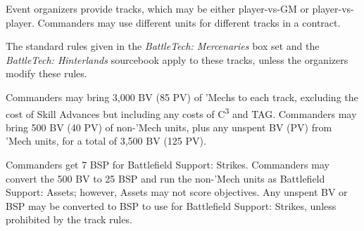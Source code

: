 Event organizers provide tracks, which may be either player-vs-GM or player-vs-player.
Commanders may use different units for different tracks in a contract.

The standard rules given in the \emph{BattleTech: Mercenaries} box set and the \emph{BattleTech: Hinterlands} sourcebook apply to these tracks, unless the organizers modify these rules.

Commanders may bring 3,000 BV (85 PV) of 'Mechs to each track, excluding the cost of Skill Advances but including any costs of C\textsuperscript{3} and TAG.
Commanders may bring 500 BV (40 PV) of non-'Mech units, plus any unspent BV (PV) from 'Mech units, for a total of 3,500 BV (125 PV).

Commanders get 7 BSP for Battlefield Support: Strikes.
Commanders may convert the 500 BV to 25 BSP and run the non-'Mech units as Battlefield Support: Assets; however, Assets may not score objectives.
Any unspent BV or BSP may be converted to BSP to use for Battlefield Support: Strikes, unless prohibited by the track rules.
